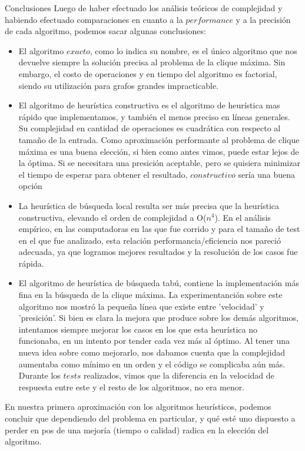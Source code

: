 \documentclass[12pt,titlepage]{article}
\newcommand{\tab}{\hspace*{2em}}
\newcommand{\Ode}[1]{O($#1$)}
\begin{document}
	\begin{section}{Conclusiones}
	\tab Luego de haber efectuado los análisis teóricos de complejidad y habiendo efectuado comparaciones en cuanto a la $performance$ y a la precisión de cada algoritmo, podemos sacar algunas conclusiones:
	\begin{itemize}
		\item El algoritmo $exacto$, como lo indica su nombre, es el único algoritmo que nos devuelve siempre la solución precisa al problema de la clique máxima. Sin embargo, el costo de operaciones y en tiempo del algoritmo es factorial, siendo su utilización para grafos grandes impracticable.
		\item El algoritmo de heurística constructiva es el algoritmo de heurística mas rápido que implementamos, y también el menos preciso en líneas generales. Su complejidad en cantidad de operaciones es cuadrática con respecto al tamaño de la entrada. Como aproximación performante al problema de clique máxima es una buena elección, si bien como antes vimos, puede estar lejos de la óptima. Si se necesitara una presición aceptable, pero se quisiera minimizar el tiempo de esperar para obtener el resultado, $constructivo$ sería una buena opción
		\item La heurística de búsqueda local resulta ser más precisa que la heurística constructiva, elevando el orden de complejidad a \Ode{n^4}. En el análisis empírico, en las computadoras en las que fue corrido y para el tamaño de test en el que fue analizado, esta relación performancia/eficiencia nos pareció adecuada, ya que logramos mejores resultados y la resolución de los casos fue rápida.
		\item El algoritmo de heurística de búsqueda tabú, contiene la implementación más fina en la búsqueda de la clique máxima. La experimentanción sobre este algoritmo nos mostró la pequeña línea que existe entre 'velocidad' y 'presición'. Si bien es clara la mejora que produce sobre los demás algoritmos, intentamos siempre mejorar los casos en los que esta heurística no funcionaba, en un intento por tender cada vez más al óptimo. Al tener una nueva idea sobre como mejorarlo, nos dabamos cuenta que la complejidad aumentaba como mínimo en un orden y el código se complicaba aún más. Durante los $tests$ realizados, vimos que la diferencia en la velocidad de respuesta entre este y el resto de los algoritmos, no era menor. 
	\end{itemize}
	En nuestra primera aproximación con los algoritmos heurísticos, podemos concluir que dependiendo del problema en particular, y qué esté uno dispuesto a perder en pos de una mejoría (tiempo o calidad) radica en la elección del algoritmo.


\end{section}
\end{document}
